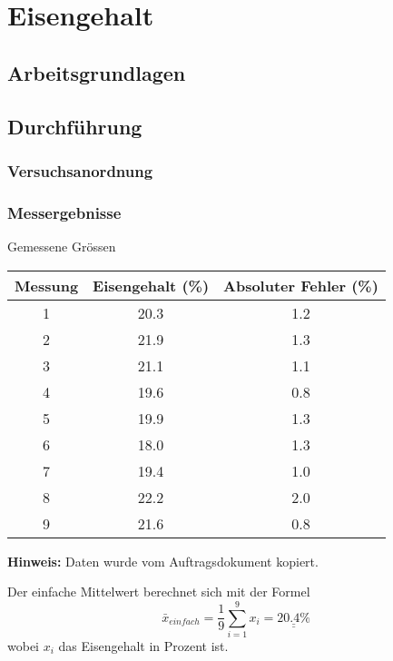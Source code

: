 \section{Eisengehalt}

\subsection{Arbeitsgrundlagen}

\subsection{Durchf\"{u}hrung}

\subsubsection*{Versuchsanordnung}

\subsubsection*{Messergebnisse}

\begin{threeparttable}
    \caption{Gemessene Gr\"ossen}
    \begin{tabular}{ccc}
        \toprule
        Messung & Eisengehalt (\%) & Absoluter Fehler (\%) \\
        \midrule
        1   & 20.3  & 1.2 \\
        2   & 21.9  & 1.3 \\
        3   & 21.1  & 1.1 \\
        4   & 19.6  & 0.8 \\
        5   & 19.9  & 1.3 \\
        6   & 18.0  & 1.3 \\
        7   & 19.4  & 1.0 \\
        8   & 22.2  & 2.0 \\
        9   & 21.6  & 0.8 \\
        \bottomrule
    \end{tabular}
    \begin{tablenotes}
        \small
        \item \textbf{Hinweis:} Daten wurde vom Auftragsdokument kopiert.
    \end{tablenotes}
\end{threeparttable}

Der einfache Mittelwert berechnet sich mit der Formel
\[ \bar{x}_{einfach} = \frac{1}{9} \sum_{i=1}^{9} x_i = \underline{\underline{20.4 \textrm{\%}}} \]
wobei $x_i$ das Eisengehalt in Prozent ist.

